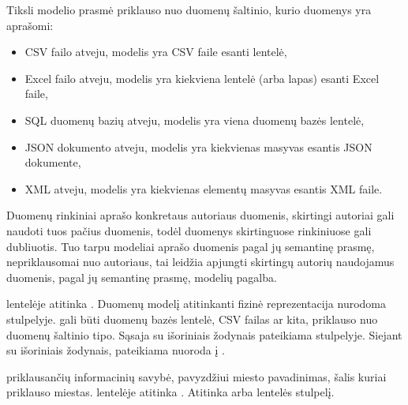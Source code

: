 \documentclass[letterpaper,10pt,lithuanian]{sphinxmanual}
\begin{document}
\begin{description}
\sphinxAtStartPar
Tiksli modelio prasmė priklauso nuo duomenų šaltinio, kurio duomenys
yra aprašomi:
\begin{itemize}
\item {} 
\sphinxAtStartPar
CSV failo atveju, modelis yra CSV faile esanti lentelė,

\item {} 
\sphinxAtStartPar
Excel failo atveju, modelis yra kiekviena lentelė (arba lapas) esanti
Excel faile,

\item {} 
\sphinxAtStartPar
SQL duomenų bazių atveju, modelis yra viena duomenų bazės lentelė,

\item {} 
\sphinxAtStartPar
JSON dokumento atveju, modelis yra kiekvienas masyvas esantis JSON
dokumente,

\item {} 
\sphinxAtStartPar
XML atveju, modelis yra kiekvienas elementų masyvas esantis XML faile.

\end{itemize}

\sphinxAtStartPar
Duomenų rinkiniai aprašo konkretaus autoriaus duomenis, skirtingi
autoriai gali naudoti tuos pačius duomenis, todėl duomenys skirtinguose
rinkiniuose gali dubliuotis. Tuo tarpu modeliai aprašo duomenis pagal
jų semantinę prasmę, nepriklausomai nuo autoriaus, tai leidžia apjungti
skirtingų autorių naudojamus duomenis, pagal jų semantinę prasmę,
modelių pagalba.

\sphinxAtStartPar
{\hyperref[\detokenize{savokos:term-DSA}]{}} lentelėje atitinka {\hyperref[\detokenize{formatas:model}]{}}. Duomenų modelį atitinkanti
fizinė reprezentacija nurodoma {\hyperref[\detokenize{formatas:source}]{}} stulpelyje. {\hyperref[\detokenize{formatas:source}]{}}
gali būti duomenų bazės lentelė, CSV failas ar kita, priklauso nuo
duomenų šaltinio tipo. Sąsaja su išoriniais žodynais pateikiama
{\hyperref[\detokenize{formatas:uri}]{}} stulpelyje. Siejant su išoriniais žodynais, pateikiama
nuoroda į .

\sphinxAtStartPar
{\hyperref[\detokenize{savokos:term-modelis}]{}} priklausančių informacinių
{\hyperref[\detokenize{savokos:term-objektas}]{}} savybė, pavyzdžiui miesto pavadinimas, šalis
kuriai priklauso miestas. {\hyperref[\detokenize{savokos:term-DSA}]{}} lentelėje atitinka
{\hyperref[\detokenize{formatas:property}]{}}. Atitinka  arba lentelės stulpelį.


\end{description}
\end{document}
